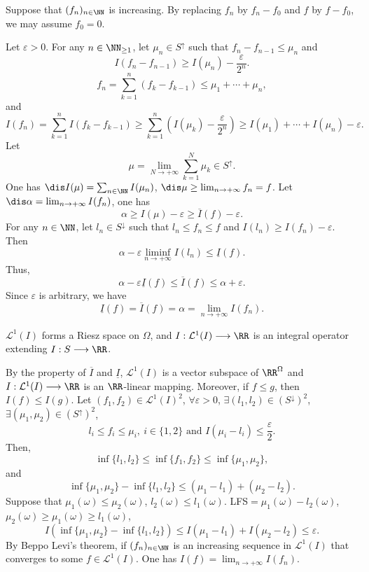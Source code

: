 \begin{proofenv}
    Suppose that $(f_n)_{n\in\NN}$ is increasing. By replacing $f_n$ by $f_n-f_0$ and $f$ by $f-f_0$, we may assume $f_0=0$.

    \quad Let $\varepsilon>0$. For any $n\in\NN_{\ge 1}$, let $\mu_n\in S^\uparrow$ such that $f_n-f_{n-1}\le \mu_n$ and
    $$ I(f_n-f_{n-1})\ge I(\mu_n)-\frac{\varepsilon}{2^n}.$$
    $$ f_n=\sum_{k=1}^{n}(f_k-f_{k-1})\le \mu_{1}+\cdots+\mu_n,$$
    and
    $$ I(f_n)=\sum_{k=1}^{n}I(f_k-f_{k-1})\ge \sum_{k=1}^{n}\left(I(\mu_k)-\frac{\varepsilon}{2^n}\right)\ge I(\mu_1)+\cdots+I(\mu_n)-\varepsilon.$$
    Let 
    $$\mu= \lim_{N\rightarrow +\infty} \sum_{k=1}^{N}\mu_k\in S^\uparrow.$$
    One has $\dis I(\mu)=\sum_{n\in\NN}I(\mu_n)$, $\dis \mu\ge \lim_{n\rightarrow+\infty}f_n=f$. Let $\dis \alpha=\lim_{n\rightarrow +\infty}I(f_n)$, one has
    $$ \alpha\ge I(\mu)-\varepsilon \ge \overline{I}(f)-\varepsilon.$$
    For any $n\in\NN$, let $l_n\in S^{\downarrow}$ such that $l_n\le f_n\le f$ and $I(l_n)\ge I(f_n)-\varepsilon$. Then 
    $$\alpha-\varepsilon\liminf_{n\rightarrow +\infty} I(l_n)\le \underline{ I}(f)
     .$$
    Thus, 
    $$ \alpha-\varepsilon\underline{I}(f)\le \overline{I}(f)\le \alpha+\varepsilon.$$
    Since $\varepsilon$ is arbitrary, we have 
    $$ \underline{I}(f)=\overline{I}(f)=\alpha=\lim_{n\rightarrow +\infty}I(f_n).$$
\end{proofenv}
\begin{theoremenv}[Daniell]
    $\mathcal{L}^1(I)$ forms a Riesz space on $\Omega$, and $I:\mathcal{L}^1(I)\longrightarrow \RR$ is an integral operator extending $I: S\longrightarrow \RR$.
\end{theoremenv}
\begin{proofenv}
    By the property of $\overline{I}$ and $\underline{I}$, $\mathcal{L}^1(I)$ is a vector subspace of $\RR^\Omega$ and $I:\mathcal{L}^1(I)\longrightarrow \RR$ is an $\RR$-linear mapping. Moreover, if $f\le g$, then $I(f)\le I(g)$.
    Let $(f_1,f_2)\in \mathcal{L}^1(I)^2$, $\forall \varepsilon>0$, $\exists(l_1,l_2)\in \left(S^\downarrow\right)^2$, $\exists (\mu_1,\mu_2)\in \left(S^\uparrow\right)^2$, 
    $$l_i\le f_i \le \mu_i,\ i\in \{1,2\}\text{ and } I(\mu_i-l_i)\le \frac{\varepsilon}{2}.$$
    Then,
    $$ \inf\{l_1,l_2\}\le \inf\{f_1,f_2\} \le \inf\{\mu_1,\mu_2\},$$
    and
    $$ \inf\{\mu_1,\mu_2\}-\inf\{l_1,l_2\}\le (\mu_1-l_1)+(\mu_2-l_2).$$
    Suppose that $\mu_1(\omega)\le \mu_2(\omega)$, $l_2(\omega)\le l_1(\omega)$. LFS$=\mu_1(\omega)-l_2(\omega)$, $\mu_2(\omega)\ge \mu_1(\omega)\ge l_1(\omega)$,
    $$ I\left(\inf\{\mu_1,\mu_2\}-\inf\{l_1,l_2\}\right)\le I(\mu_1-l_1)+I(\mu_2-l_2)\le \varepsilon.$$
    By Beppo Levi's theorem, if $(f_n)_{n\in\NN}$ is an increasing sequence in $\mathcal{L}^1(I)$ that converges to some $f\in \mathcal{L}^1(I)$. One has $I(f)=\lim_{n\rightarrow +\infty}I(f_n)$.
\end{proofenv}
